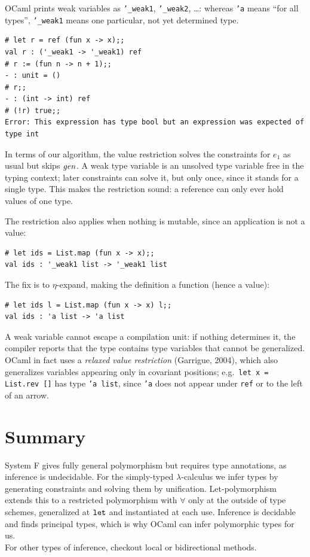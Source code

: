 OCaml prints weak variables as \texttt{'\_weak1}, \texttt{'\_weak2}, \ldots: whereas
\texttt{'a} means ``for all types'', \texttt{'\_weak1} means one particular, not yet
determined type.
\begin{verbatim}
# let r = ref (fun x -> x);;
val r : ('_weak1 -> '_weak1) ref
# r := (fun n -> n + 1);;
- : unit = ()
# r;;
- : (int -> int) ref
# (!r) true;;
Error: This expression has type bool but an expression was expected of type int
\end{verbatim}
In terms of our algorithm, the value restriction solves the constraints for $e_1$ as
usual but skips $\mathit{gen}$. A weak type variable is an unsolved type variable free in the
typing context; later constraints can solve it, but only once, since it stands for a
single type. This makes the restriction sound: a reference can only ever hold values
of one type.

The restriction also applies when nothing is mutable, since an application is not a
value:
\begin{verbatim}
# let ids = List.map (fun x -> x);;
val ids : '_weak1 list -> '_weak1 list
\end{verbatim}
The fix is to $\eta$-expand, making the definition a function (hence a value):
\begin{verbatim}
# let ids l = List.map (fun x -> x) l;;
val ids : 'a list -> 'a list
\end{verbatim}
A weak variable cannot escape a compilation unit: if nothing determines it, the
compiler reports that the type contains type variables that cannot be generalized.
OCaml in fact uses a \emph{relaxed value restriction} (Garrigue, 2004), which also
generalizes variables appearing only in covariant positions; e.g.\
\texttt{let x = List.rev []} has type \texttt{'a list}, since \texttt{'a} does not
appear under \texttt{ref} or to the left of an arrow.

\section{Summary}

System F gives fully general polymorphism but requires type annotations, as inference
is undecidable. For the simply-typed $\lambda$-calculus we infer types by generating
constraints and solving them by unification. Let-polymorphism extends this to a
restricted polymorphism with $\forall$ only at the outside of type schemes,
generalized at $\mathtt{let}$ and instantiated at each use. Inference is decidable and
finds principal types, which is why OCaml can infer polymorphic types for us.\\

For other types of inference, checkout local or bidirectional methods.
% 
